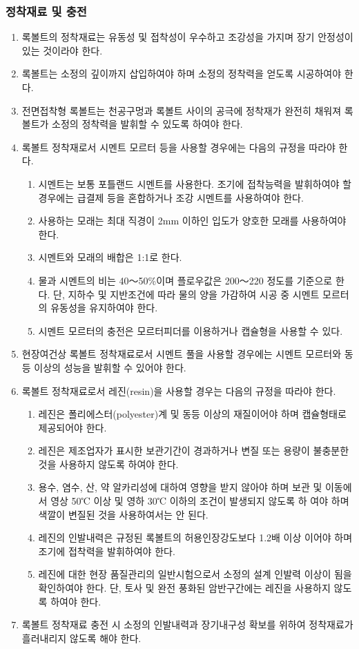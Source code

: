 \documentclass[12pt,a4paper]{article}
\begin{document}
\subsubsection{정착재료 및 충전}
\begin{enumerate}
\item  록볼트의 정착재료는 유동성 및 접착성이 우수하고 조강성을 가지며 장기 안정성이 있는 것이라야 한다.  
\item  록볼트는 소정의 깊이까지 삽입하여야 하며 소정의 정착력을 얻도록 시공하여야 한다.  
\item  전면접착형 록볼트는 천공구멍과 록볼트 사이의 공극에 정착재가 완전히 채워져 록볼트가 소정의 정착력을 발휘할 수 있도록 하여야 한다.  
\item  록볼트 정착재로서 시멘트 모르터 등을 사용할 경우에는 다음의 규정을 따라야 한다.  
	\begin{enumerate}
	\item  시멘트는 보통 포틀랜드 시멘트를 사용한다. 조기에 접착능력을 발휘하여야 할 경우에는 급결제 등을 혼합하거나 
	       조강 시멘트를 사용하여야 한다. 
	\item  사용하는 모래는 최대 직경이 2mm 이하인 입도가 양호한 모래를 사용하여야 한다. 
	\item  시멘트와 모래의 배합은 1:1로 한다. 
	\item  물과 시멘트의 비는 40～50\%이며 플로우값은 200～220 정도를 기준으로 한다. 
	       단, 지하수 및 지반조건에 따라 물의 양을 가감하여 시공 중 시멘트 모르터의 유동성을 유지하여야 한다. 
	\item  시멘트 모르터의 충전은 모르터피더를 이용하거나 캡슐형을 사용할 수 있다. 
	\end{enumerate}
\item  현장여건상 록볼트 정착재료로서 시멘트 풀을 사용할 경우에는 시멘트 모르터와 동등 이상의 성능을 발휘할 수 있어야 한다.  
\item  록볼트 정착재료로서 레진(resin)을 사용할 경우는 다음의 규정을 따라야 한다.  
	\begin{enumerate}
	\item  레진은 폴리에스터(polyester)계 및 동등 이상의 재질이어야 하며 캡슐형태로 제공되어야 한다. 
	\item  레진은 제조업자가 표시한 보관기간이 경과하거나 변질 또는 용량이 불충분한 것을 사용하지 않도록 하여야 한다. 
	\item  용수, 염수, 산, 약 알카리성에 대하여 영향을 받지 않아야 하며 보관 및 이동에서 영상 50℃ 이상 
	       및 영하 30℃ 이하의 조건이 발생되지 않도록 하	여야 하며 색깔이 변질된 것을 사용하여서는 안 된다. 
	\item  레진의 인발내력은 규정된 록볼트의 허용인장강도보다 1.2배 이상 이어야 하며 조기에 접착력을 발휘하여야 한다. 
	\item  레진에 대한 현장 품질관리의 일반시험으로서 소정의 설계 인발력 이상이 됨을 확인하여야 한다. 
	       단, 토사 및 완전 풍화된 암반구간에는 레진을 사용하지 않도록 하여야 한다. 
	\end{enumerate}
\item  록볼트 정착재료 충전 시 소정의 인발내력과 장기내구성 확보를 위하여 정착재료가 흘러내리지 않도록 해야 한다.   
\end{enumerate}
\end{document}
